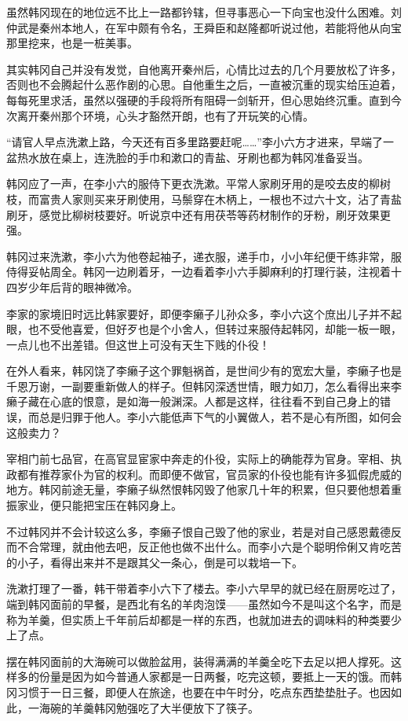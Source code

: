 虽然韩冈现在的地位远不比上一路都钤辖，但寻事恶心一下向宝也没什么困难。刘仲武是秦州本地人，在军中颇有令名，王舜臣和赵隆都听说过他，若能将他从向宝那里挖来，也是一桩美事。

其实韩冈自己并没有发觉，自他离开秦州后，心情比过去的几个月要放松了许多，否则也不会腾起什么恶作剧的心思。自他重生之后，一直被沉重的现实给压迫着，每每死里求活，虽然以强硬的手段将所有阻碍一剑斩开，但心思始终沉重。直到今次离开秦州那个环境，心头才豁然开朗，也有了开玩笑的心情。

“请官人早点洗漱上路，今天还有百多里路要赶呢……”李小六方才进来，早端了一盆热水放在桌上，连洗脸的手巾和漱口的青盐、牙刷也都为韩冈准备妥当。

韩冈应了一声，在李小六的服侍下更衣洗漱。平常人家刷牙用的是咬去皮的柳树枝，而富贵人家则买来牙刷使用，马鬃穿在木柄上，一根也不过六十文，沾了青盐刷牙，感觉比柳树枝要好。听说京中还有用茯苓等药材制作的牙粉，刷牙效果更强。

韩冈过来洗漱，李小六为他卷起袖子，递衣服，递手巾，小小年纪便干练非常，服侍得妥帖周全。韩冈一边刷着牙，一边看着李小六手脚麻利的打理行装，注视着十四岁少年后背的眼神微冷。

李家的家境旧时远比韩家要好，即便李癞子儿孙众多，李小六这个庶出儿子并不起眼，也不受他喜爱，但好歹也是个小舍人，但转过来服侍起韩冈，却能一板一眼，一点儿也不出差错。但这世上可没有天生下贱的仆役！

在外人看来，韩冈饶了李癞子这个罪魁祸首，是世间少有的宽宏大量，李癞子也是千恩万谢，一副要重新做人的样子。但韩冈深透世情，眼力如刀，怎么看得出来李癞子藏在心底的恨意，是如海一般渊深。人都是这样，往往看不到自己身上的错误，而总是归罪于他人。李小六能低声下气的小翼做人，若不是心有所图，如何会这般卖力？

宰相门前七品官，在高官显宦家中奔走的仆役，实际上的确能荐为官身。宰相、执政都有推荐家仆为官的权利。而即便不做官，官员家的仆役也能有许多狐假虎威的地方。韩冈前途无量，李癞子纵然恨韩冈毁了他家几十年的积累，但只要他想着重振家业，便只能把宝压在韩冈身上。

不过韩冈并不会计较这么多，李癞子恨自己毁了他的家业，若是对自己感恩戴德反而不合常理，就由他去吧，反正他也做不出什么。而李小六是个聪明伶俐又肯吃苦的小子，看得出来并不是跟其父一条心，倒是可以栽培一下。

洗漱打理了一番，韩干带着李小六下了楼去。李小六早早的就已经在厨房吃过了，端到韩冈面前的早餐，是西北有名的羊肉泡馍——虽然如今不是叫这个名字，而是称为羊羹，但实质上千年前后却都是一样的东西，也就加进去的调味料的种类要少上了点。

摆在韩冈面前的大海碗可以做脸盆用，装得满满的羊羹全吃下去足以把人撑死。这样多的份量是因为如今普通人家都是一日两餐，吃完这顿，要抵上一天的饿。而韩冈习惯于一日三餐，即便人在旅途，也要在中午时分，吃点东西垫垫肚子。也因如此，一海碗的羊羹韩冈勉强吃了大半便放下了筷子。

